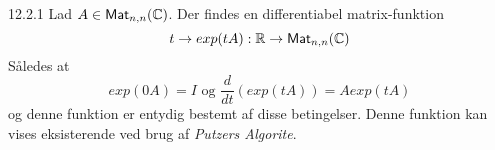 \begin{definition}{12.2.1}
	Lad $A \in \textsf{Mat}_{n,n}(\mathbb{C})$. Der findes en differentiabel 
	matrix-funktion 
	\[
		t \rightarrow exp(tA) : \mathbb{R} \rightarrow 
		\textsf{Mat}_{n,n}(\mathbb{C})
	\]
	Således at
	\[
		exp(0A) = I \text{ og } \frac{d}{dt}(exp(tA)) = A exp(tA)
	\]
	og denne funktion er entydig bestemt af disse betingelser. Denne funktion
	kan vises eksisterende ved brug af \textit{Putzers Algorite}.
\end{definition}
